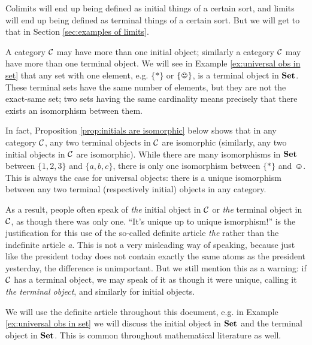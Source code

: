 \documentclass[CT4S-EN-RU]{subfiles}
\begin{document}
\begin{blockENG}
Colimits will end up being defined as initial things of a certain sort, and limits will end up being defined as terminal things of a certain sort. But we will get to that in Section \ref{sec:examples of limits}.
\end{blockENG}

\begin{blockRUS}
\end{blockRUS}

\begin{warningENG}
A category $\mathcal{C}$ may have more than one initial object; similarly a category $\mathcal{C}$ may have more than one terminal object. We will see in Example \ref{ex:universal obs in set} that any set with one element, e.g. $\{*\}$ or $\singleton$, is a terminal object in ${\mathbf{Set}}$. These terminal sets have the same number of elements, but they are not the exact-same set; two sets having the same cardinality means precisely that there exists an isomorphism between them.

In fact, Proposition \ref{prop:initials are isomorphic} below shows that in any category $\mathcal{C}$, any two terminal objects in $\mathcal{C}$ are isomorphic (similarly, any two initial objects in $\mathcal{C}$ are isomorphic). While there are many isomorphisms in ${\mathbf{Set}}$ between $\{1,2,3\}$ and $\{a,b,c\}$, there is only one isomorphism between $\{*\}$ and $\smiley$. This is always the case for universal objects: there is a unique isomorphism between any two terminal (respectively initial) objects in any category.

As a result, people often speak of {\em the} initial object in $\mathcal{C}$ or {\em the} terminal object in $\mathcal{C}$, as though there was only one. “It's unique up to unique ismorphism!” is the justification for this use of the so-called definite article {\em the} rather than the indefinite article {\em a}. This is not a very misleading way of speaking, because just like the president today does not contain exactly the same atoms as the president yesterday, the difference is unimportant. But we still mention this as a warning: if $\mathcal{C}$ has a terminal object, we may speak of it as though it were unique, calling it {\em the terminal object}, and similarly for initial objects.

We will use the definite article throughout this document, e.g. in Example \ref{ex:universal obs in set} we will discuss the initial object in ${\mathbf{Set}}$ and the terminal object in ${\mathbf{Set}}$. This is common throughout mathematical literature as well.
\end{warningENG}
\end{document}
